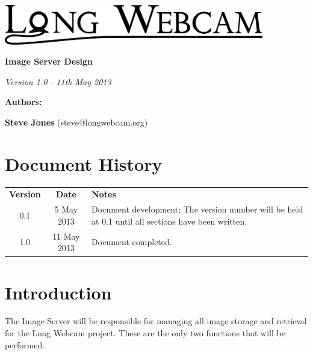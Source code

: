 \documentclass[11pt]{article}
\begin{document}
\begin{titlepage}
\begin{center}

\includegraphics[width=0.85\textwidth]{./Logo_Large-cropped_black.png}

\vspace{3 cm}

\textbf{\Huge{Image Server Design}}

\vspace{1 cm}

\textit{\large{Version 1.0 - 11th May 2013}}

\vspace{4 cm}

\textbf{\Large{Authors:}}

\textbf{Steve Jones} (steve@longwebcam.org)

\end{center}

\end{titlepage}

\setcounter{tocdepth}{2}
\tableofcontents
\clearpage
{}
\section*{Document History}
\begin{table}[tbhp!]
\begin{tabular}{ c c p{4in} }
\textbf{Version} & \textbf{Date} & \textbf{Notes} \\
0.1 & 5 May 2013 & Document development; The version number will be held at 0.1 until all sections have been written. \\
1.0 & 11 May 2013 & Document completed.
\end{tabular}
\end{table}

\clearpage
{}


\section{Introduction}
The Image Server will be responsible for managing all image storage and retrieval for the Long Webcam project. These are the only two functions that will be performed.
\end{document}
